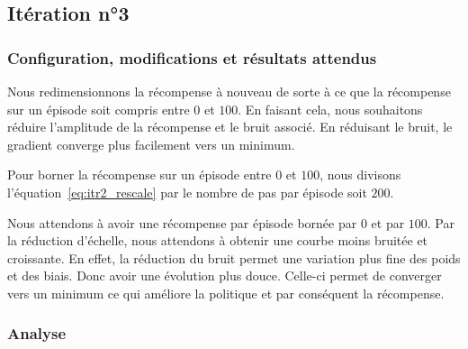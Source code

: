 \subsection{Itération n°3}

\subsubsection{Configuration, modifications et résultats attendus}

Nous redimensionnons la récompense à nouveau de sorte à ce que la récompense sur un épisode soit compris entre $0$ et $100$. En faisant cela, nous souhaitons réduire l'amplitude de la récompense et le bruit associé. En réduisant le bruit, le gradient converge plus facilement vers un minimum.

Pour borner la récompense sur un épisode entre $0$ et $100$, nous divisons l'équation~\ref{eq:itr2_rescale} par le nombre de pas par épisode soit $200$.

Nous attendons à avoir une récompense par épisode bornée par $0$ et par $100$. Par la réduction d'échelle, nous attendons à obtenir une courbe moins bruitée et croissante. En effet, la réduction du bruit permet une variation plus fine des poids et des biais.  Donc avoir une évolution plus douce. Celle-ci permet de converger vers un minimum ce qui améliore la politique et par conséquent la récompense.

\subsubsection{Analyse}

